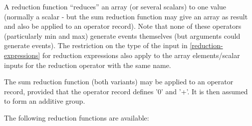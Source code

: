 A reduction function ``reduces'' an array (or several scalars) to one
value (normally a scalar - but the sum reduction function may give an
array as result and also be applied to an operator record). Note that
none of these operators (particularly min and max) generate events
themselves (but arguments could generate events). The restriction on the
type of the input in \autoref{reduction-expressions} for reduction expressions also
apply to the array elements/scalar inputs for the reduction operator
with the same name.

The sum reduction function (both variants) may be applied to an operator
record, provided that the operator record defines '0' and '+'. It is
then assumed to form an additive group.

The following reduction functions are available:


